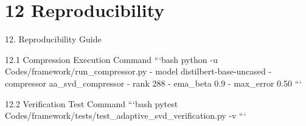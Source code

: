 \section{12 Reproducibility}

 12. Reproducibility Guide

 12.1 Compression Execution Command
```bash
python -u Codes/framework/run\_compressor.py - model distilbert-base-uncased - compressor aa\_svd\_compressor - rank 288 - ema\_beta 0.9 - max\_error 0.50
```

 12.2 Verification Test Command
```bash
pytest Codes/framework/tests/test\_adaptive\_svd\_verification.py -v
```
